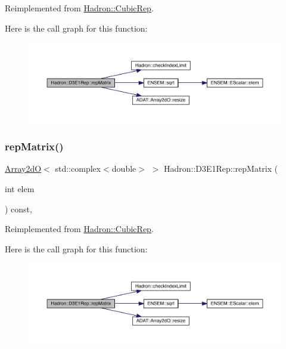 Reimplemented from \mbox{\hyperlink{structHadron_1_1CubicRep_ac5d7e9e6f4ab1158b5fce3e4ad9e8005}{Hadron\+::\+Cubic\+Rep}}.

Here is the call graph for this function\+:
\nopagebreak
\begin{figure}[H]
\begin{center}
\leavevmode
\includegraphics[width=350pt]{d3/daf/structHadron_1_1D3E1Rep_ac66aebdefbd99d129891c85cbc86b430_cgraph}
\end{center}
\end{figure}
\mbox{\label{structHadron_1_1D3E1Rep_ac66aebdefbd99d129891c85cbc86b430}} 
\subsubsection{\texorpdfstring{repMatrix()}{repMatrix()}\hspace{0.1cm}{\footnotesize\ttfamily [3/3]}}
{\footnotesize\ttfamily \mbox{\hyperlink{classADAT_1_1Array2dO}{Array2dO}}$<$ std\+::complex$<$double$>$ $>$ Hadron\+::\+D3\+E1\+Rep\+::rep\+Matrix (\begin{DoxyParamCaption}\item[{int}]{elem }\end{DoxyParamCaption}) const\hspace{0.3cm}{\ttfamily [inline]}, {\ttfamily [virtual]}}



Reimplemented from \mbox{\hyperlink{structHadron_1_1CubicRep_ac5d7e9e6f4ab1158b5fce3e4ad9e8005}{Hadron\+::\+Cubic\+Rep}}.

Here is the call graph for this function\+:
\nopagebreak
\begin{figure}[H]
\begin{center}
\leavevmode
\includegraphics[width=350pt]{d3/daf/structHadron_1_1D3E1Rep_ac66aebdefbd99d129891c85cbc86b430_cgraph}
\end{center}
\end{figure}


